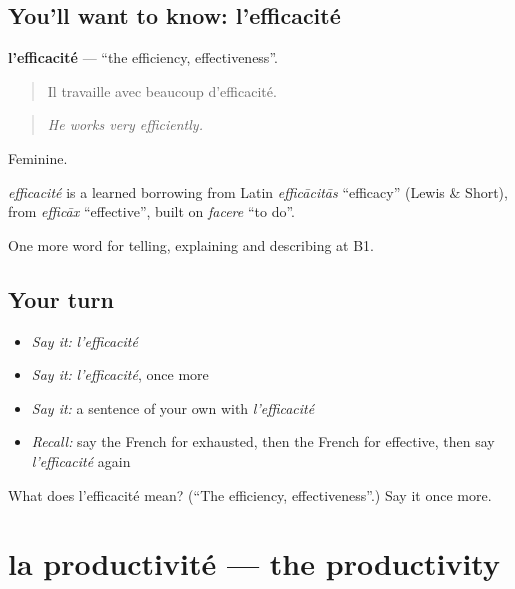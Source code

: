 \subsection*{You'll want to know: l'efficacité}
\textbf{l'efficacité} — \textquotedblleft{}the efficiency, effectiveness\textquotedblright{}.

\begin{quote}
Il travaille avec beaucoup d'efficacité.
\end{quote}

\begin{quote}
\emph{He works very efficiently.}
\end{quote}

Feminine.

\begin{cousinweb}
\emph{efficacité} is a learned borrowing from Latin \emph{efficācitās} \textquotedblleft{}efficacy\textquotedblright{} (Lewis \& Short), from \emph{efficāx} \textquotedblleft{}effective\textquotedblright{}, built on \emph{facere} \textquotedblleft{}to do\textquotedblright{}.
\end{cousinweb}

\begin{grammarlens}[title={What you've built}]
One more word for telling, explaining and describing at B1.
\end{grammarlens}

\subsection*{Your turn}
\begin{itemize}
\raggedright
  \item \emph{Say it:} \emph{l'efficacité}
  \item \emph{Say it:} \emph{l'efficacité}, once more
  \item \emph{Say it:} a sentence of your own with \emph{l'efficacité}
  \item \emph{Recall:} say the French for exhausted, then the French for effective, then say \emph{l'efficacité} again
\end{itemize}

\begin{tcolorbox}[breakable,colback=teal!4,colframe=teal!35!black,title={Before you move on}]
What does l'efficacité mean? (\textquotedblleft{}The efficiency, effectiveness\textquotedblright{}.) Say it once more.
\end{tcolorbox}
\section[la productivité]{la productivité — the productivity}

